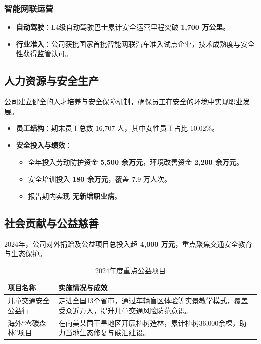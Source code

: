 \documentclass[a4paper,12pt]{article}
\begin{document}
\subsubsection{智能网联运营}
\begin{itemize}
    \item \textbf{自动驾驶}：L4级自动驾驶巴士累计安全运营里程突破 \textbf{1,700 万公里}。
    \item \textbf{行业准入}：公司获批国家首批智能网联汽车准入试点企业，技术成熟度与安全性获得监管认可。
\end{itemize}

\subsection{人力资源与安全生产}
公司建立健全的人才培养与安全保障机制，确保员工在安全的环境中实现职业发展。
\begin{itemize}
    \item \textbf{员工结构}：期末员工总数 16,707 人，其中女性员工占比 10.02\%。
    \item \textbf{安全投入与绩效}：
    \begin{itemize}
        \item 全年投入劳动防护资金 \textbf{5,500 余万元}，环境改善资金 \textbf{2,200 余万元}。
        \item 安全培训投入 \textbf{180 余万元}，覆盖 7.9 万人次。
        \item 报告期内实现 \textbf{无新增职业病}。
    \end{itemize}
\end{itemize}

\subsection{社会贡献与公益慈善}
2024年，公司对外捐赠及公益项目总投入超 \textbf{4,000 万元}，重点聚焦交通安全教育与生态保护。

\begin{table}[h]
\centering
\caption{2024年度重点公益项目}
\begin{tabular}{p{} p{}}
\toprule
\textbf{项目名称} & \textbf{实施情况与成效} \\
\midrule
儿童交通安全公益行 & 走进全国13个省市，通过车辆盲区体验等实景教学模式，覆盖受众近万人，提升儿童交通风险防范意识。 \\
海外“零碳森林”项目 & 在南美某国干旱地区开展植树造林，累计植树36,000余棵，助力当地生态修复与碳汇建设。 \\
\bottomrule
\end{tabular}
\end{table}
\end{document}
